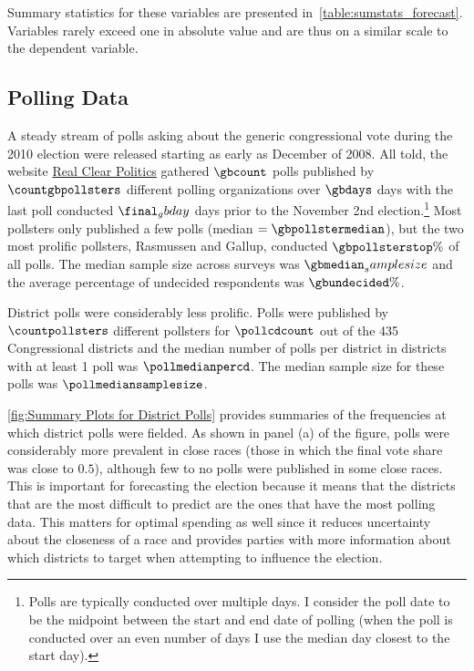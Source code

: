 \documentclass[12pt,final,fleqn]{article}
\theoremstyle{plain}
\begin{document}
Summary statistics for these variables are presented in~\autoref{table:sumstats_forecast}. Variables rarely exceed one in absolute value and are thus on a similar scale to the dependent variable.

\subsection{Polling Data} \label{sec:poll-data}
A steady stream of polls asking about the generic congressional vote during the 2010 election were released starting as early as December of 2008. All told, the website \href{http://www.realclearpolitics.com/}{Real Clear Politics} gathered  $\gbcount$ polls published by $\countgbpollsters$ different polling organizations over $\gbdays$ days with the last poll conducted $\final_gbday$ days prior to the November 2nd election.\footnote{Polls are typically conducted over multiple days. I consider the poll date to be the midpoint between the start and end date of polling (when the poll is conducted over an even number of days I use the median day closest to the start day).} Most pollsters only published a few polls (median $= \gbpollstermedian$), but the two most prolific pollsters,  Rasmussen and Gallup, conducted $\gbpollsterstop\%$ of all polls. The median sample size across surveys was $\gbmedian_samplesize$ and the average percentage of undecided respondents was $\gbundecided\%$.

District polls were considerably less prolific. Polls were published by $\countpollsters$ different pollsters for $\pollcdcount$ out of the 435 Congressional districts and the median number of polls per district in districts with at least 1 poll was $\pollmedianpercd$. The median sample size for these polls was $\pollmediansamplesize$. 

\autoref{fig:Summary Plots for District Polls} provides summaries of the frequencies at which district polls were fielded. As shown in panel (a) of the figure, polls were considerably more prevalent in close races (those in which the final vote share was close to $0.5$), although few to no polls were published in some close races. This is important for forecasting the election because it means that the districts that are the most difficult to predict are the ones that have the most polling data. This matters for optimal spending as well since it reduces uncertainty about the closeness of a race and provides parties with more information about which districts to target when attempting to influence the election.
\end{document}
